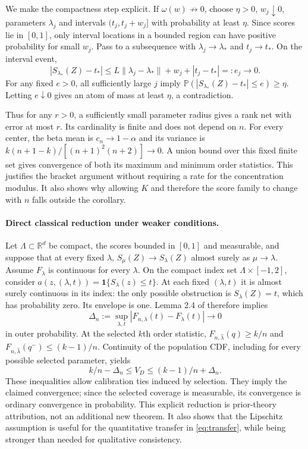 \documentclass{article}
\newcommand{\PP}{\mathbb P}
\newcommand{\ind}{\mathbf 1}
\newcommand{\R}{\mathbb R}
\begin{document}
We make the compactness step explicit. If $\omega(w)\not\to0$, choose $\eta>0$, $w_j\downarrow0$, parameters $\lambda_j$ and intervals $(t_j,t_j+w_j]$ with probability at least $\eta$. Since scores lie in $[0,1]$, only interval locations in a bounded region can have positive probability for small $w_j$. Pass to a subsequence with $\lambda_j\to\lambda_*$ and $t_j\to t_*$. On the interval event,
\begin{equation}
 |S_{\lambda_*}(Z)-t_*|\le L\|\lambda_j-\lambda_*\|+w_j+|t_j-t_*|=:e_j\to0.
\end{equation}
For any fixed $e>0$, all sufficiently large $j$ imply $\PP(|S_{\lambda_*}(Z)-t_*|\le e)\ge\eta$. Letting $e\downarrow0$ gives an atom of mass at least $\eta$, a contradiction.

Thus for any $r>0$, a sufficiently small parameter radius gives a rank net with error at most $r$. Its cardinality is finite and does not depend on $n$. For every center, the beta mean is $c_n\to1-\alpha$ and its variance is $k(n+1-k)/[(n+1)^2(n+2)]\to0$. A union bound over this fixed finite set gives convergence of both its maximum and minimum order statistics. This justifies the bracket argument without requiring a rate for the concentration modulus. It also shows why allowing $K$ and therefore the score family to change with $n$ falls outside the corollary.

\paragraph{Direct classical reduction under weaker conditions.}
Let $\Lambda\subset\R^d$ be compact, the scores bounded in $[0,1]$ and measurable, and suppose that at every fixed $\lambda$, $S_\mu(Z)\to S_\lambda(Z)$ almost surely as $\mu\to\lambda$. Assume $F_\lambda$ is continuous for every $\lambda$. On the compact index set $\Lambda\times[-1,2]$, consider $a(z,(\lambda,t))=\ind\{S_\lambda(z)\le t\}$. At each fixed $(\lambda,t)$ it is almost surely continuous in its index: the only possible obstruction is $S_\lambda(Z)=t$, which has probability zero. Its envelope is one. Lemma 2.4 of \citet{newey1994} therefore implies
\begin{equation}
 \Delta_n:=\sup_{\lambda,t}|F_{n,\lambda}(t)-F_\lambda(t)|\longrightarrow0
\end{equation}
in outer probability. At the selected $k$th order statistic, $F_{n,\hat\lambda}(q)\ge k/n$ and $F_{n,\hat\lambda}(q^-)\le(k-1)/n$. Continuity of the population CDF, including for every possible selected parameter, yields
\begin{equation}
 k/n-\Delta_n\le V_D\le(k-1)/n+\Delta_n.
\end{equation}
These inequalities allow calibration ties induced by selection. They imply the claimed convergence; since the selected coverage is measurable, its convergence is ordinary convergence in probability. This explicit reduction is prior-theory attribution, not an additional new theorem. It also shows that the Lipschitz assumption is useful for the quantitative transfer in \cref{eq:transfer}, while being stronger than needed for qualitative consistency.
\end{document}
